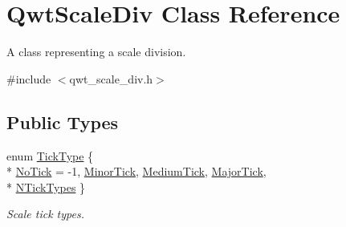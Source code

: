 \hypertarget{class_qwt_scale_div}{\section{Qwt\-Scale\-Div Class Reference}
\label{class_qwt_scale_div}
}


A class representing a scale division.  




{\ttfamily \#include $<$qwt\-\_\-scale\-\_\-div.\-h$>$}

\subsection*{Public Types}
\begin{DoxyCompactItemize}
\item 
enum \hyperlink{class_qwt_scale_div_af21aedaa886dd5e067cf63505838736c}{Tick\-Type} \{ \\*
\hyperlink{class_qwt_scale_div_af21aedaa886dd5e067cf63505838736ca9f64c3f9efef05e3020903a54331c4ac}{No\-Tick} = -\/1, 
\hyperlink{class_qwt_scale_div_af21aedaa886dd5e067cf63505838736ca6af9f3b95636a6fdebb4824c6db0ab9e}{Minor\-Tick}, 
\hyperlink{class_qwt_scale_div_af21aedaa886dd5e067cf63505838736ca42fbe3ad54900057e75225ff5e68cc4a}{Medium\-Tick}, 
\hyperlink{class_qwt_scale_div_af21aedaa886dd5e067cf63505838736cadda390d4186a0ff20ece95d986c1ae60}{Major\-Tick}, 
\\*
\hyperlink{class_qwt_scale_div_af21aedaa886dd5e067cf63505838736ca86796bbf72d5eb7162a924ba27ce6553}{N\-Tick\-Types}
 \}
\begin{DoxyCompactList}\small\item\em Scale tick types. \end{DoxyCompactList}\end{DoxyCompactItemize}
